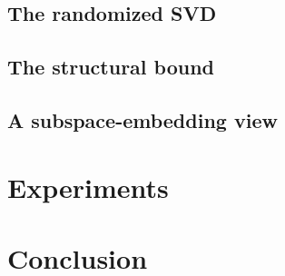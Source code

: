 \documentclass[11pt,a4paper]{article}
\theoremstyle{definition}
\begin{document}
\subsection{The randomized SVD}
\subsection{The structural bound}
\subsection{A subspace-embedding view}

\section{Experiments}\label{sec:experiments}

\section{Conclusion}\label{sec:conclusion}



\end{document}
